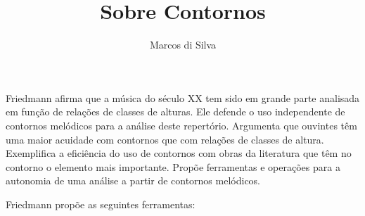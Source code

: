 \documentclass{article}
\title{Sobre Contornos}
\author{Marcos di Silva}
\begin{document}
\setlength{\parindent}{0cm}
\maketitle
\thispagestyle{empty}

Friedmann \cite{friedmann85:_method_discus_contour} afirma que a
música do século XX tem sido em grande parte analisada em função de
relações de classes de alturas. Ele defende o uso independente de
contornos melódicos para a análise deste repertório. Argumenta que
ouvintes têm uma maior acuidade com contornos que com relações de
classes de altura. Exemplifica a eficiência do uso de contornos com
obras da literatura que têm no contorno o elemento mais
importante. Propõe ferramentas e operações para a autonomia de uma
análise a partir de contornos melódicos.

Friedmann \cite{friedmann85:_method_discus_contour} propõe as seguintes
ferramentas:
\end{document}
